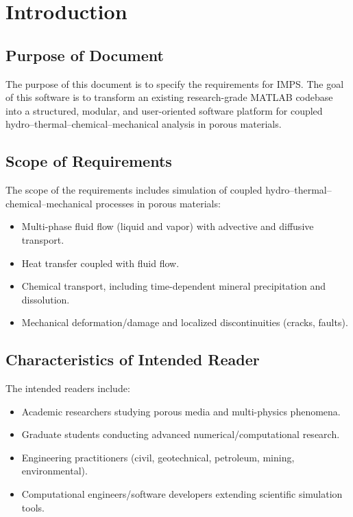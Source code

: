\documentclass[12pt]{article}
\newcommand{\progname}{IMPS}
\begin{document}
\newpage
{}

\section{Introduction}

\subsection{Purpose of Document}

The purpose of this document is to specify the requirements for \progname. The
goal of this software is to transform an existing research-grade MATLAB codebase
into a structured, modular, and user-oriented software platform for coupled
hydro--thermal--chemical--mechanical analysis in porous materials.

\subsection{Scope of Requirements}

The scope of the requirements includes simulation of coupled
hydro--thermal--chemical--mechanical processes in porous materials:
\begin{itemize}
  \item Multi-phase fluid flow (liquid and vapor) with advective and diffusive transport.
  \item Heat transfer coupled with fluid flow.
  \item Chemical transport, including time-dependent mineral precipitation and dissolution.
  \item Mechanical deformation/damage and localized discontinuities (cracks, faults).
\end{itemize}

\subsection{Characteristics of Intended Reader} \label{sec_IntendedReader}

The intended readers include:
\begin{itemize}
  \item Academic researchers studying porous media and multi-physics phenomena.
  \item Graduate students conducting advanced numerical/computational research.
  \item Engineering practitioners (civil, geotechnical, petroleum, mining, environmental).
  \item Computational engineers/software developers extending scientific simulation tools.
\end{itemize}
\end{document}
